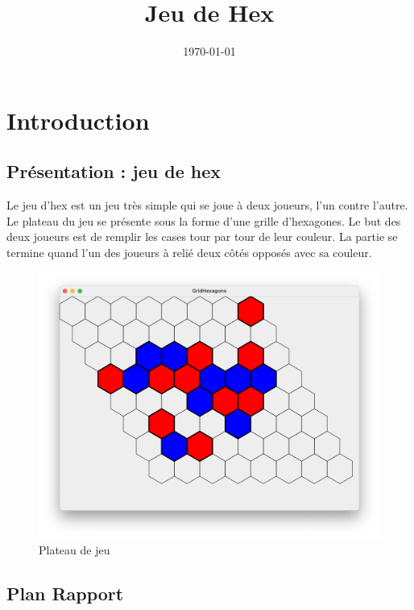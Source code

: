 \documentclass[12pt]{article}
\title{Jeu de Hex}
\author{}
\date{\today}
\begin{document}
\maketitle
\thispagestyle{empty}
\setcounter{page}{0}

\newpage
\tableofcontents
\newpage

\section{Introduction}

	\subsection{Présentation : jeu de hex}
	
Le jeu d'hex est un jeu très simple qui se joue à deux joueurs, l'un contre l'autre. Le plateau du jeu se présente sous la forme d'une grille d'hexagones. Le but des deux joueurs est de remplir les cases tour par tour de leur couleur. La partie se termine quand l'un des joueurs à relié deux côtés opposés avec sa couleur.

\begin{figure}[ht]
  \begin{center}
    \includegraphics[width=1\textwidth]{./images/Board} 
  \end{center}
  \caption{Plateau de jeu}
\end{figure}

	\subsection{Plan Rapport}
\end{document}

